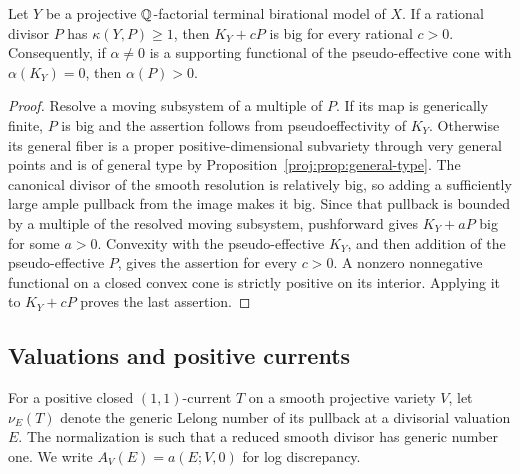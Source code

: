 \begin{corollary}\label{proj:ex:supporting}
Let \(Y\) be a projective \(\mathbb{Q}\)-factorial terminal birational model
of \(X\). If a rational divisor \(P\) has \(\kappa(Y,P)\geq1\),
then \(K_Y+cP\) is big for every rational \(c>0\).
Consequently, if \(\alpha\neq0\) is a supporting functional of the
pseudo-effective cone with \(\alpha(K_Y)=0\), then
\(\alpha(P)>0\).
\end{corollary}
\begin{proof}
Resolve a moving subsystem of a multiple of \(P\). If its map is
generically finite, \(P\) is big and the assertion follows from
pseudoeffectivity of \(K_Y\). Otherwise its general fiber is a
proper positive-dimensional subvariety through very general
points and is of general type by Proposition~\ref{proj:prop:general-type}.
The canonical divisor of the smooth resolution is relatively big,
so adding a sufficiently large ample pullback from the image makes
it big. Since that pullback is bounded by a multiple of the
resolved moving subsystem, pushforward gives \(K_Y+aP\) big for
some \(a>0\). Convexity with the pseudo-effective \(K_Y\), and then
addition of the pseudo-effective \(P\), gives the assertion for
every \(c>0\). A nonzero nonnegative functional on a closed convex
cone is strictly positive on its interior. Applying it to
\(K_Y+cP\) proves the last assertion.
\end{proof}

\subsection{Valuations and positive currents}

For a positive closed \((1,1)\)-current \(T\) on a smooth projective
variety \(V\), let \(\nu_E(T)\) denote the generic Lelong number of
its pullback at a divisorial valuation \(E\). The normalization is
such that a reduced smooth divisor has generic number one. We
write \(A_V(E)=a(E;V,0)\) for log discrepancy.

